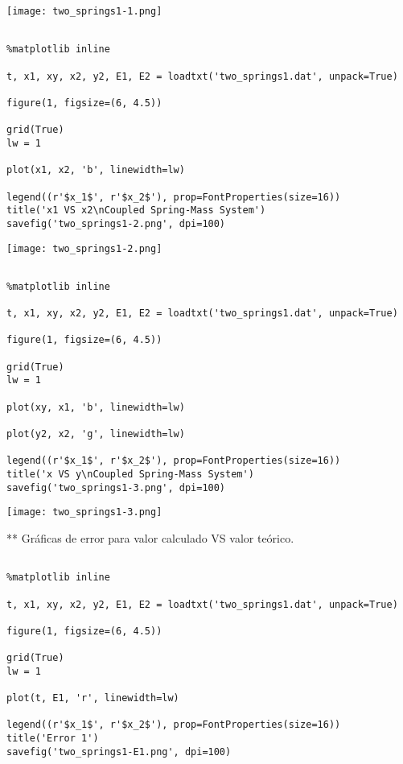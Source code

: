 \documentclass{article} %
\begin{document}
\begin{center}
 	\texttt{[image: two\_springs1-1.png]}
 \end{center}





\begin{verbatim} 

%matplotlib inline

t, x1, xy, x2, y2, E1, E2 = loadtxt('two_springs1.dat', unpack=True)

figure(1, figsize=(6, 4.5))

grid(True)
lw = 1

plot(x1, x2, 'b', linewidth=lw)

legend((r'$x_1$', r'$x_2$'), prop=FontProperties(size=16))
title('x1 VS x2\nCoupled Spring-Mass System')
savefig('two_springs1-2.png', dpi=100)

\end{verbatim}


\begin{center}
 	\texttt{[image: two\_springs1-2.png]}
 \end{center}


\begin{verbatim} 

%matplotlib inline

t, x1, xy, x2, y2, E1, E2 = loadtxt('two_springs1.dat', unpack=True)

figure(1, figsize=(6, 4.5))

grid(True)
lw = 1

plot(xy, x1, 'b', linewidth=lw)

plot(y2, x2, 'g', linewidth=lw)

legend((r'$x_1$', r'$x_2$'), prop=FontProperties(size=16))
title('x VS y\nCoupled Spring-Mass System')
savefig('two_springs1-3.png', dpi=100)

\end{verbatim}



\begin{center}
 	\texttt{[image: two\_springs1-3.png]}
 \end{center}



** Gráficas de error para valor calculado VS valor teórico.


\begin{verbatim} 

%matplotlib inline

t, x1, xy, x2, y2, E1, E2 = loadtxt('two_springs1.dat', unpack=True)

figure(1, figsize=(6, 4.5))

grid(True)
lw = 1

plot(t, E1, 'r', linewidth=lw)

legend((r'$x_1$', r'$x_2$'), prop=FontProperties(size=16))
title('Error 1')
savefig('two_springs1-E1.png', dpi=100)

\end{verbatim}
\end{document}
